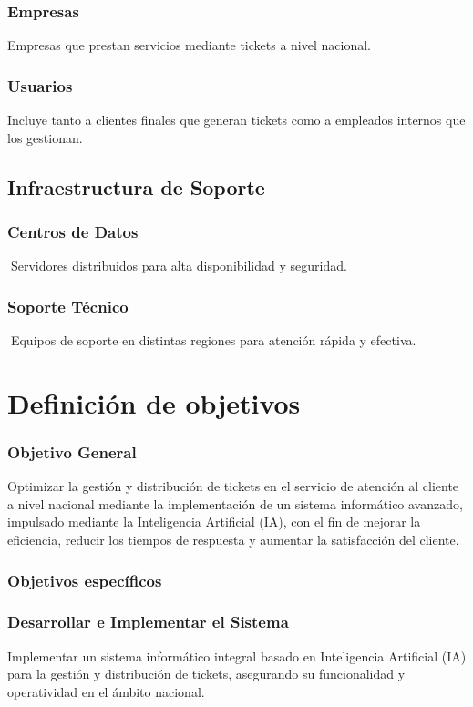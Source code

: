 \documentclass[a4paper,12pt]{article}
\begin{document}
\subsubsection{Empresas}
 Empresas que prestan servicios mediante tickets a nivel nacional.
 \subsubsection{Usuarios}
 Incluye tanto a clientes finales que generan tickets como a empleados internos que los gestionan.

\subsection{Infraestructura de Soporte}
\subsubsection{Centros de Datos}
Servidores distribuidos para alta disponibilidad y seguridad.
\subsubsection{Soporte Técnico}
Equipos de soporte en distintas regiones para atención rápida y efectiva.

\section{Definición de objetivos}
\subsubsection{Objetivo General}
Optimizar la gestión y distribución de tickets en el servicio de atención al cliente a nivel nacional mediante la implementación de un sistema informático avanzado, impulsado mediante la Inteligencia Artificial (IA), con el fin de mejorar la eficiencia, reducir los tiempos de respuesta y aumentar la satisfacción del cliente.
\subsubsection{Objetivos específicos}
\subsubsection{Desarrollar e Implementar el Sistema}
Implementar un sistema informático integral basado en Inteligencia Artificial (IA) para la gestión y distribución de tickets, asegurando su funcionalidad y operatividad en el ámbito nacional.
\end{document}
